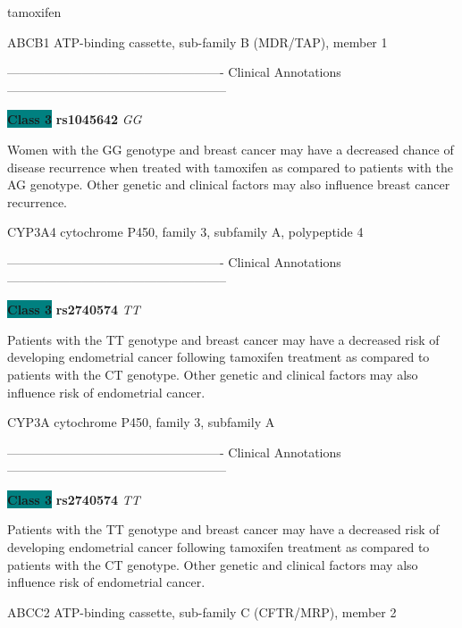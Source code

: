 \documentclass{resume} %
\begin{document}
\begin{rSection}{ tamoxifen }
\begin{rSubsection}{ ABCB1 }{ ATP-binding cassette, sub-family B (MDR/TAP), member 1 }{}{}
\item[] ---------------------------------------------------- Clinical Annotations -----------------------------------------------------\newline
\item \textbf{\colorbox{teal} {Class 3}} \textbf{ rs1045642 } \textit{ GG }
\item[] Women with the GG genotype and breast cancer may have a decreased chance of disease recurrence when treated with tamoxifen as compared to patients with the AG genotype. Other genetic and clinical factors may also influence breast cancer recurrence.
\end{rSubsection}\begin{rSubsection}{ CYP3A4 }{ cytochrome P450, family 3, subfamily A, polypeptide 4 }{}{}
\item[]

\item[] ---------------------------------------------------- Clinical Annotations -----------------------------------------------------\newline
\item \textbf{\colorbox{teal} {Class 3}} \textbf{ rs2740574 } \textit{ TT }
\item[] Patients with the TT genotype and breast cancer may have a decreased risk of developing endometrial cancer following tamoxifen treatment as compared to patients with the CT genotype. Other genetic and clinical factors may also influence risk of endometrial cancer.
\end{rSubsection}\begin{rSubsection}{ CYP3A }{ cytochrome P450, family 3, subfamily A }{}{}
\item[]

\item[] ---------------------------------------------------- Clinical Annotations -----------------------------------------------------\newline
\item \textbf{\colorbox{teal} {Class 3}} \textbf{ rs2740574 } \textit{ TT }
\item[] Patients with the TT genotype and breast cancer may have a decreased risk of developing endometrial cancer following tamoxifen treatment as compared to patients with the CT genotype. Other genetic and clinical factors may also influence risk of endometrial cancer.
\end{rSubsection}\begin{rSubsection}{ ABCC2 }{ ATP-binding cassette, sub-family C (CFTR/MRP), member 2 }{}{}
\item[]


\end{rSubsection}
\end{rSection}
\end{document}
